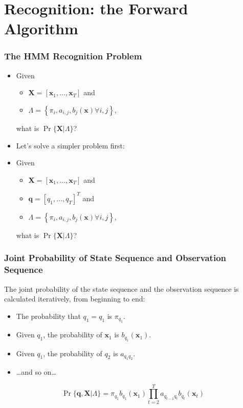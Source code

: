 \documentclass{beamer}
\begin{document}
\section[Recognition]{Recognition: the Forward Algorithm}
\setcounter{subsection}{1}

\begin{frame}
  \frametitle{The HMM Recognition Problem}

  \begin{itemize}
  \item Given \begin{itemize} \item $\mathbf{X} = [\mathbf{x}_1,\ldots,\mathbf{x}_T]$ and
    \item $\Lambda=\left\{\pi_i,a_{i,j},b_j(\mathbf{x})\forall i,j\right\}$,\end{itemize} what is $\Pr\{\mathbf{X}|\Lambda\}$?
  \item Let's solve a simpler problem first:
  \item Given \begin{itemize}\item $\mathbf{X} = [\mathbf{x}_1,\ldots,\mathbf{x}_T]$ and
    \item $\mathbf{q} = [q_1,\ldots,q_T]^T$ and
    \item $\Lambda=\left\{\pi_i,a_{i,j},b_j(\mathbf{x})\forall i,j\right\}$,\end{itemize} what is $\Pr\{\mathbf{X}|\Lambda\}$?
  \end{itemize}
\end{frame}
  
\begin{frame}
  \frametitle{Joint Probability of State Sequence and Observation Sequence}

  The joint probability of the state sequence and the observation
  sequence is calculated iteratively, from beginning to end:
  \begin{itemize}
  \item The probability that $q_1=q_1$ is $\pi_{q_1}$.
  \item Given $q_1$, the probability of $\mathbf{x}_1$ is $b_{q_1}(\mathbf{x}_1)$.
  \item Given $q_1$, the probability of $q_2$ is $a_{q_1q_2}$.
  \item \ldots and so on\ldots
  \end{itemize}
  \[
  \Pr\{\mathbf{q},\mathbf{X}|\Lambda\}=\pi_{q_1}b_{q_1}(\mathbf{x}_1)\prod_{t=2}^T a_{q_{t-1}q_t}b_{q_t}(\mathbf{x}_t)
  \]
\end{frame}
\end{document}
